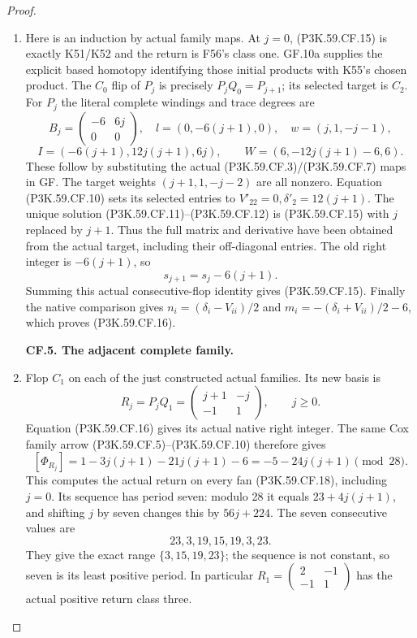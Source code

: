 \begin{proof}
\begin{enumerate}[label=\arabic*.]
\item Here is an induction by actual family maps. At \(j=0\), (P3K.59.CF.15)
is exactly K51/K52 and the return is F56's class one. GF.10a
supplies the explicit based homotopy identifying those initial
products with K55's chosen product. The \(C_0\) flip of \(P_j\)
is precisely \(P_jQ_0=P_{j+1}\); its selected target is \(C_2\).
For \(P_j\) the literal complete windings and trace degrees are
\[
 B_j=\begin{pmatrix}-6&6j\\0&0\end{pmatrix},\quad
 l=(0,-6(j+1),0),\quad w=(j,1,-j-1),
\]
\[
 I=(-6(j+1),12j(j+1),6j),\qquad
 W=(6,-12j(j+1)-6,6).                                \tag{P3K.59.CF.17}
\]
These follow by substituting the actual (P3K.59.CF.3)/(P3K.59.CF.7) maps in GF.
The target weights \((j+1,1,-j-2)\) are all nonzero.
Equation (P3K.59.CF.10) sets its selected entries to
\(V'_{22}=0,\delta'_2=12(j+1)\). The unique solution
(P3K.59.CF.11)--\allowbreak (P3K.59.CF.12) is (P3K.59.CF.15) with \(j\) replaced by \(j+1\).
Thus the full matrix and derivative have been obtained from the
actual target, including their off-diagonal entries.
The old right integer is \(-6(j+1)\), so
\[
 s_{j+1}=s_j-6(j+1).
\]
Summing this actual consecutive-flop identity gives (P3K.59.CF.15).
Finally the native comparison gives
\(n_i=(\delta_i-V_{ii})/2\) and
\(m_i=-(\delta_i+V_{ii})/2-6\), which proves (P3K.59.CF.16).

\par\medskip\noindent\textbf{CF.5. The adjacent complete family.}\par\nopagebreak[4]

\item Flop \(C_1\) on each of the just constructed actual families.
Its new basis is
\[
 R_j=P_jQ_1=\begin{pmatrix}j+1&-j\\-1&1\end{pmatrix},
 \qquad j\ge0.                                       \tag{P3K.59.CF.18}
\]
Equation (P3K.59.CF.16) gives its actual native right integer.
The same Cox family arrow (P3K.59.CF.5)--\allowbreak (P3K.59.CF.10) therefore gives
\[
 [\Phi_{R_j}]=1-3j(j+1)-21j(j+1)-6
             =-5-24j(j+1)\pmod {28}.                 \tag{P3K.59.CF.19}
\]
This computes the actual return on every fan (P3K.59.CF.18), including
\(j=0\). Its sequence has period seven: modulo 28 it equals
\(23+4j(j+1)\), and shifting \(j\) by seven changes this
by \(56j+224\). The seven consecutive values are
\[
                         23,3,19,15,19,3,23 .
\]
They give the exact range \(\{3,15,19,23\}\); the sequence
is not constant, so seven is its least positive period.
In particular
\(R_1=(\begin{smallmatrix}2&-1\\-1&1\end{smallmatrix})\)
has the actual positive return class three.


\end{enumerate}
\end{proof}
